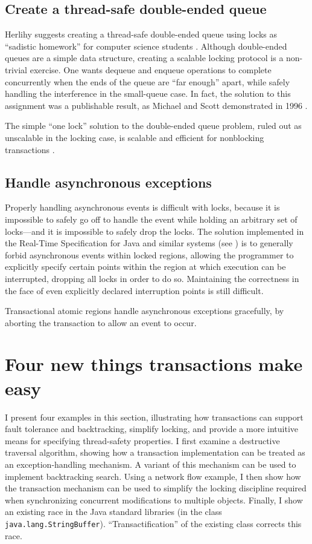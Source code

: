 \subsection{Create a thread-safe double-ended queue}
Herlihy suggests creating a thread-safe double-ended queue using locks
as ``sadistic homework'' for computer science students \cite{Herlihy05}.
Although double-ended queues are a simple data structure,
creating a scalable locking protocol is a
non-trivial exercise.  One wants dequeue and enqueue operations to
complete concurrently when the ends of the queue are ``far enough''
apart, while safely handling the interference in the small-queue case.
In fact, the solution to this assignment was a publishable result, as
Michael and Scott demonstrated in 1996 \cite{MichaelSc96}.

The simple ``one lock'' solution to the double-ended queue
problem, ruled out as unscalable in the locking case, is scalable and
efficient for nonblocking transactions \cite{HerlihyLuMo03,Herlihy05}.

\subsection{Handle asynchronous exceptions}
Properly handling asynchronous events is difficult with locks, because
it is impossible to safely go off to handle the event while holding an
arbitrary set of locks---and it is impossible to safely drop the
locks.  The solution implemented in the Real-Time Specification for
Java \cite{BollellaBrGoDiFuTu00}
and similar systems (see \cite[section 9]{MarlowPeMoRe01}) is to generally forbid asynchronous events within
locked regions, allowing the programmer to explicitly specify certain
points within the region at which execution can be interrupted,
dropping all locks in order to do so.  Maintaining the correctness
in the face of even explicitly declared interruption points is still
difficult.

Transactional atomic regions handle asynchronous exceptions
gracefully, by aborting the transaction to allow an
event to occur.

\section{Four new things transactions make easy}

I present four examples in this section, illustrating how transactions
can support fault tolerance and backtracking, simplify locking, and
provide a more intuitive means for specifying thread-safety
properties.  I first examine a destructive traversal algorithm,
showing how a transaction implementation can be treated as an
exception-handling mechanism.  A variant of this mechanism can be used
to implement backtracking search.  Using a network flow example, I
then show how the transaction mechanism can be used to simplify the
locking discipline required when synchronizing concurrent
modifications to multiple objects.  Finally, I show an existing race
in the Java standard libraries (in the class
\texttt{java.lang.StringBuffer}).  ``Transactification'' of the
existing class corrects this race.

